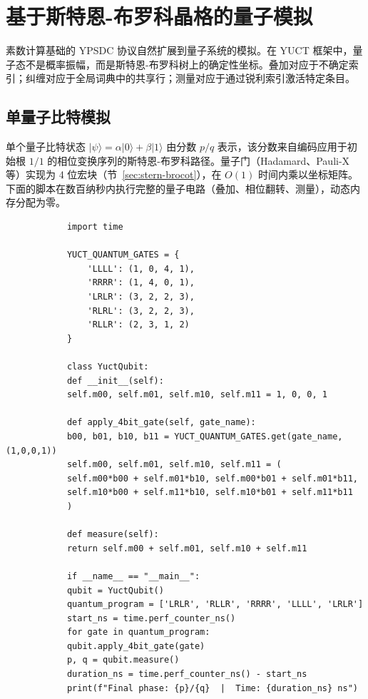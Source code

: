 \documentclass[11pt,a4paper]{article}
\begin{document}
	\section{基于斯特恩-布罗科晶格的量子模拟}
	\label{sec:quantum-emulation}
	
	素数计算基础的 YPSDC 协议自然扩展到量子系统的模拟。在 YUCT 框架中，量子态不是概率振幅，而是斯特恩-布罗科树上的确定性坐标。叠加对应于不确定索引；纠缠对应于全局词典中的共享行；测量对应于通过锐利索引激活特定条目。
	
	\subsection{单量子比特模拟}
	
	单个量子比特状态 \(\vert\psi\rangle = \alpha\vert0\rangle + \beta\vert1\rangle\) 由分数 \(p/q\) 表示，该分数来自编码应用于初始根 \(1/1\) 的相位变换序列的斯特恩-布罗科路径。量子门（Hadamard、Pauli-X 等）实现为 4 位宏块（节~\ref{sec:stern-brocot}），在 \(O(1)\) 时间内乘以坐标矩阵。下面的脚本在数百纳秒内执行完整的量子电路（叠加、相位翻转、测量），动态内存分配为零。
	
	\begin{tcolorbox}[title=YUCT 单量子比特模拟器 (Python), breakable]
		\begin{lstlisting}
			import time
			
			YUCT_QUANTUM_GATES = {
				'LLLL': (1, 0, 4, 1),
				'RRRR': (1, 4, 0, 1),
				'LRLR': (3, 2, 2, 3),
				'RLRL': (3, 2, 2, 3),
				'RLLR': (2, 3, 1, 2)
			}
			
			class YuctQubit:
			def __init__(self):
			self.m00, self.m01, self.m10, self.m11 = 1, 0, 0, 1
			
			def apply_4bit_gate(self, gate_name):
			b00, b01, b10, b11 = YUCT_QUANTUM_GATES.get(gate_name, (1,0,0,1))
			self.m00, self.m01, self.m10, self.m11 = (
			self.m00*b00 + self.m01*b10, self.m00*b01 + self.m01*b11,
			self.m10*b00 + self.m11*b10, self.m10*b01 + self.m11*b11
			)
			
			def measure(self):
			return self.m00 + self.m01, self.m10 + self.m11
			
			if __name__ == "__main__":
			qubit = YuctQubit()
			quantum_program = ['LRLR', 'RLLR', 'RRRR', 'LLLL', 'LRLR']
			start_ns = time.perf_counter_ns()
			for gate in quantum_program:
			qubit.apply_4bit_gate(gate)
			p, q = qubit.measure()
			duration_ns = time.perf_counter_ns() - start_ns
			print(f"Final phase: {p}/{q}  |  Time: {duration_ns} ns")
		\end{lstlisting}
	\end{tcolorbox}
	
\end{document}
